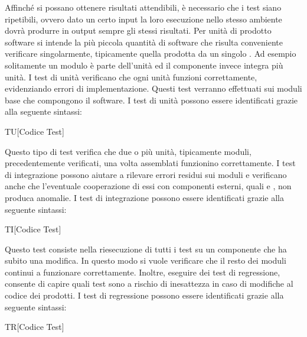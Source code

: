 Affinché si possano ottenere risultati attendibili, è necessario che i test siano ripetibili, ovvero dato un certo input la loro esecuzione nello stesso ambiente dovrà produrre in output sempre gli stessi risultati.
\label{test}
Per unità di prodotto software si intende la più piccola quantità di software che risulta conveniente verificare singolarmente, tipicamente quella prodotta da un singolo \rp. Ad esempio solitamente un modulo è parte dell'unità ed il componente invece integra più unità.
I test di unità verificano che ogni unità funzioni correttamente, evidenziando errori di implementazione. Questi test verranno effettuati sui moduli base che compongono il software.
I test di unità possono essere identificati grazie alla seguente sintassi:
\begin{center}
TU[Codice Test]
\end{center}
Questo tipo di test verifica che due o più unità, tipicamente moduli, precedentemente verificati, una volta assemblati funzionino correttamente. I test di integrazione possono aiutare a rilevare errori residui sui moduli e verificano anche che l'eventuale cooperazione di essi con componenti esterni, quali  e , non produca anomalie.
I test di integrazione possono essere identificati grazie alla seguente sintassi:
\begin{center}
TI[Codice Test]
\end{center}
Questo test consiste nella riesecuzione di tutti i test su un componente che ha subito una modifica. In questo modo si vuole verificare che il resto dei moduli continui a funzionare correttamente. Inoltre, eseguire dei test di regressione, consente di capire quali test sono a rischio di inesattezza in caso di modifiche al codice dei prodotti.
I test di regressione possono essere identificati grazie alla seguente sintassi:
\begin{center}
TR[Codice Test]
\end{center}
